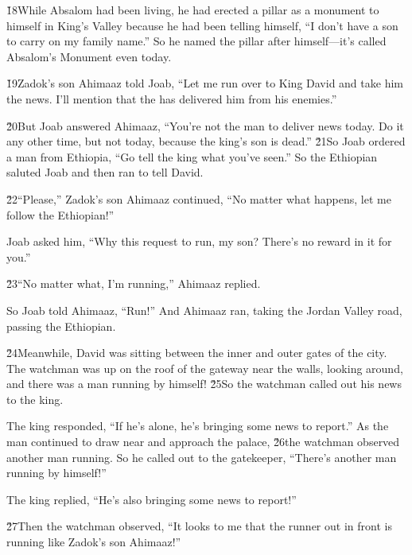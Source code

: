\v{18}While Absalom had been living, he had erected a pillar as a monument to himself in King's Valley because he had been telling himself, ``I don't have a son to carry on my family name.'' So he named the pillar after himself---it's called Absalom's Monument even today.

\v{19}Zadok's son Ahimaaz told Joab, ``Let me run over to King David and take him the news. I'll mention that the  has delivered him from his enemies.''

\v{20}But Joab answered Ahimaaz, ``You're not the man to deliver news today. Do it any other time, but not today, because the king's son is dead.'' \v{21}So Joab ordered a man from Ethiopia, ``Go tell the king what you've seen.'' So the Ethiopian saluted Joab and then ran to tell David.

\v{22}``Please,'' Zadok's son Ahimaaz continued, ``No matter what happens, let me follow the Ethiopian!''

Joab asked him, ``Why this request to run, my son? There's no reward in it for you.''

\v{23}``No matter what, I'm running,'' Ahimaaz replied.

So Joab told Ahimaaz, ``Run!'' And Ahimaaz ran, taking the Jordan Valley road, passing the Ethiopian.

\v{24}Meanwhile, David was sitting between the inner and outer gates of the city. The watchman was up on the roof of the gateway near the walls, looking around, and there was a man running by himself! \v{25}So the watchman called out his news to the king.

The king responded, ``If he's alone, he's bringing some news to report.'' As the man continued to draw near and approach the palace, \v{26}the watchman observed another man running. So he called out to the gatekeeper, ``There's another man running by himself!''

The king replied, ``He's also bringing some news to report!''

\v{27}Then the watchman observed, ``It looks to me that the runner out in front is running like Zadok's son Ahimaaz!''

